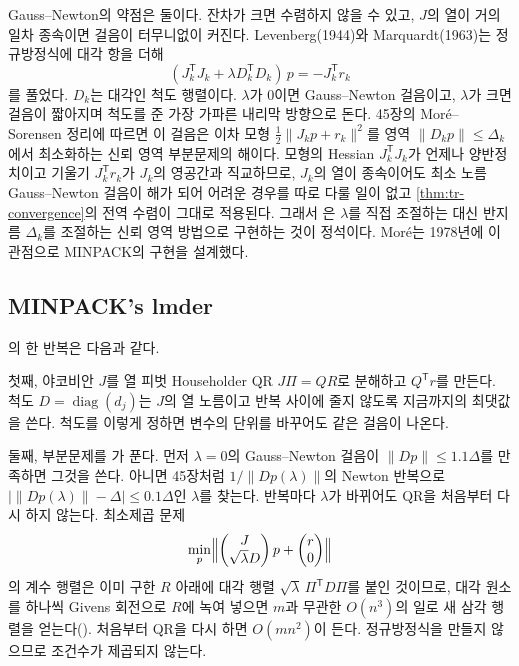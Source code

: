 Gauss--Newton의 약점은 둘이다. 잔차가 크면 수렴하지 않을 수 있고, $J$의 열이 거의 일차 종속이면 걸음이 터무니없이 커진다. Levenberg(1944)와 Marquardt(1963)는 정규방정식에 대각 항을 더해
\[
(J_k^{\mathsf T}J_k+\lambda D_k^{\mathsf T}D_k)\,p=-J_k^{\mathsf T}r_k
\]
를 풀었다\cite{levenberg1944,marquardt1963}. $D_k$는 대각인 척도 행렬이다. $\lambda$가 $0$이면 Gauss--Newton 걸음이고, $\lambda$가 크면 걸음이 짧아지며 척도를 준 가장 가파른 내리막 방향으로 돈다. 45장의 Moré--Sorensen 정리에 따르면 이 걸음은 이차 모형 $\frac12\|J_kp+r_k\|^2$를 영역 $\|D_kp\|\le\Delta_k$에서 최소화하는 신뢰 영역 부분문제의 해이다. 모형의 Hessian $J_k^{\mathsf T}J_k$가 언제나 양반정치이고 기울기 $J_k^{\mathsf T}r_k$가 $J_k$의 영공간과 직교하므로, $J_k$의 열이 종속이어도 최소 노름 Gauss--Newton 걸음이 해가 되어 어려운 경우를 따로 다룰 일이 없고 \cref{thm:tr-convergence}의 전역 수렴이 그대로 적용된다. 그래서 은 $\lambda$를 직접 조절하는 대신 반지름 $\Delta_k$를 조절하는 신뢰 영역 방법으로 구현하는 것이 정석이다. Moré는 1978년에 이 관점으로 MINPACK의 구현을 설계했다\cite{more1978lm,more1980minpack}.

\subsection{MINPACK's lmder}

의 한 반복은 다음과 같다\cite{more1978lm}.

첫째, 야코비안 $J$를 열 피벗 Householder QR $J\Pi=QR$로 분해하고 $Q^{\mathsf T}r$를 만든다. 척도 $D=\operatorname{diag}(d_j)$는 $J$의 열 노름이고 반복 사이에 줄지 않도록 지금까지의 최댓값을 쓴다. 척도를 이렇게 정하면 변수의 단위를 바꾸어도 같은 걸음이 나온다.

둘째, 부분문제를 가 푼다. 먼저 $\lambda=0$의 Gauss--Newton 걸음이 $\|Dp\|\le1.1\Delta$를 만족하면 그것을 쓴다. 아니면 45장처럼 $1/\|Dp(\lambda)\|$의 Newton 반복으로 $\bigl|\|Dp(\lambda)\|-\Delta\bigr|\le0.1\Delta$인 $\lambda$를 찾는다. 반복마다 $\lambda$가 바뀌어도 QR을 처음부터 다시 하지 않는다. 최소제곱 문제
\[
\min_p\Bigl\|\begin{pmatrix}J\\\sqrt\lambda D\end{pmatrix}p+\begin{pmatrix}r\\0\end{pmatrix}\Bigr\|
\]
의 계수 행렬은 이미 구한 $R$ 아래에 대각 행렬 $\sqrt\lambda\,\Pi^{\mathsf T}D\Pi$를 붙인 것이므로, 대각 원소를 하나씩 Givens 회전으로 $R$에 녹여 넣으면 $m$과 무관한 $O(n^3)$의 일로 새 삼각 행렬을 얻는다(). 처음부터 QR을 다시 하면 $O(mn^2)$이 든다. 정규방정식을 만들지 않으므로 조건수가 제곱되지 않는다.

